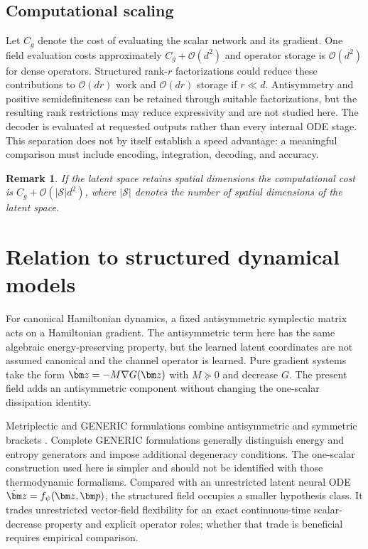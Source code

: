 \documentclass[a4paper,11pt]{article}
\newtheorem{remark}{Remark}
\newcommand{\z}{\bm z}
\newcommand{\p}{\bm p}
\begin{document}
\subsection{Computational scaling}
Let $C_g$ denote the cost of evaluating the scalar network and its gradient. One field evaluation costs approximately $C_g+\mathcal O(d^2)$ and operator storage is $\mathcal O(d^2)$ for dense operators. Structured rank-$r$ factorizations could reduce these contributions to $\mathcal O(dr)$ work and $\mathcal O(dr)$ storage if $r\ll d$. Antisymmetry and positive semidefiniteness can be retained through suitable factorizations, but the resulting rank restrictions may reduce expressivity and are not studied here. The decoder is evaluated at requested outputs rather than every internal ODE stage. This separation does not by itself establish a speed advantage: a meaningful comparison must include encoding, integration, decoding, and accuracy.

\begin{remark}
    If the latent space retains spatial dimensions the computational cost is $C_g+\mathcal O(|\mathcal S|d^2)$, where $|\mathcal S|$ denotes the number of spatial dimensions of the latent space.
\end{remark}

\section{Relation to structured dynamical models}
For canonical Hamiltonian dynamics, a fixed antisymmetric symplectic matrix acts on a Hamiltonian gradient. The antisymmetric term here has the same algebraic energy-preserving property, but the learned latent coordinates are not assumed canonical and the channel operator is learned. Pure gradient systems take the form $\dot\z=-M\nabla G(\z)$ with $M\succeq0$ and decrease $G$. The present field adds an antisymmetric component without changing the one-scalar dissipation identity.

Metriplectic and GENERIC formulations combine antisymmetric and symmetric brackets \cite{morrison1986paradigm,grmela1997dynamics}. Complete GENERIC formulations generally distinguish energy and entropy generators and impose additional degeneracy conditions. The one-scalar construction used here is simpler and should not be identified with those thermodynamic formalisms. Compared with an unrestricted latent neural ODE $\dot\z=f_\psi(\z,\p)$, the structured field occupies a smaller hypothesis class. It trades unrestricted vector-field flexibility for an exact continuous-time scalar-decrease property and explicit operator roles; whether that trade is beneficial requires empirical comparison.
\end{document}
